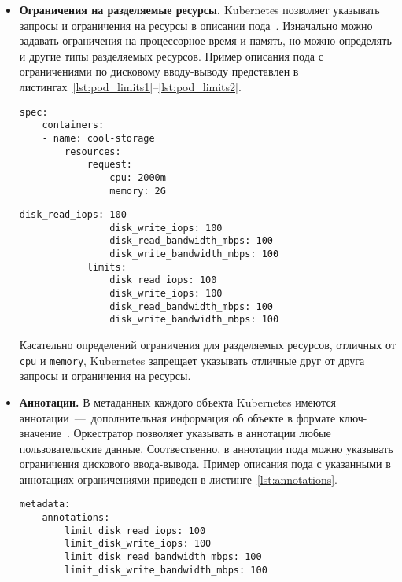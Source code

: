\begin{itemize}
	\item \textbf{Ограничения на разделяемые ресурсы.} Kubernetes позволяет указывать запросы и ограничения на ресурсы в описании пода~\cite{resource_management}. Изначально можно задавать ограничения на процессорное время и память, но можно определять и другие типы разделяемых ресурсов. Пример описания пода с ограничениями по дисковому вводу-выводу представлен в листингах~\ref{lst:pod_limits1}--\ref{lst:pod_limits2}.

\begin{minipage}[H]{\textwidth-1.25cm}
\begin{lstlisting}[label=lst:pod_limits1, caption={Указание ограничений в описании объекта Pod}]
spec:
    containers:
    - name: cool-storage
        resources:
            request:
                cpu: 2000m
                memory: 2G
\end{lstlisting}
\end{minipage}

\begin{minipage}[H]{\textwidth-1.25cm}
\begin{lstlisting}[label=lst:pod_limits2, caption={Указание ограничений в описании объекта Pod (продолжение листинга~\ref{lst:pod_limits1})}]
                disk_read_iops: 100
                disk_write_iops: 100
                disk_read_bandwidth_mbps: 100
                disk_write_bandwidth_mbps: 100
            limits:
                disk_read_iops: 100
                disk_write_iops: 100
                disk_read_bandwidth_mbps: 100
                disk_write_bandwidth_mbps: 100
\end{lstlisting}
\end{minipage}

Касательно определений ограничения для разделяемых ресурсов, отличных от \texttt{cpu} и \texttt{memory}, Kubernetes запрещает указывать отличные друг от друга запросы и ограничения на ресурсы.

\item \textbf{Аннотации.} В метаданных каждого объекта Kubernetes имеются аннотации~---~дополнительная информация об объекте в формате ключ-значение~\cite{annotations}. Оркестратор позволяет указывать в аннотации любые пользовательские данные. Соотвественно, в аннотации пода можно указывать ограничения дискового ввода-вывода. Пример описания пода с указанными в аннотациях ограничениями приведен в листинге~\ref{lst:annotations}.

\begin{minipage}[H]{\textwidth-1.25cm}
\begin{lstlisting}[label=lst:annotations, caption={Указание ограничений в аннотациях пода}]
metadata:
    annotations:
        limit_disk_read_iops: 100
        limit_disk_write_iops: 100
        limit_disk_read_bandwidth_mbps: 100
        limit_disk_write_bandwidth_mbps: 100
\end{lstlisting}
\end{minipage}


\end{itemize}

